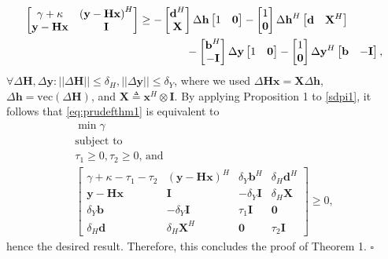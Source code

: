 \documentclass[review,sort&compress]{elsarticle}
\renewcommand{\vec}[1]{\mbox{$\mathbf{#1}$}}
\newcommand{\norm}[1]{\left|\left|#1\right|\right|}
\newcommand{\defi}{\triangleq}
\newcommand{\nn}{\nonumber}
\newcommand{\vH}{\vec{H}}
\newcommand{\vx}{\vec{x}}
\newcommand{\vy}{\vec{y}}
\newcommand{\dH}{\Delta\vH}
\newcommand{\dy}{\Delta\vy}
\newcommand{\vd}{\vec{d}}
\newcommand{\dvh}{\Delta\vec{h}}
\newcommand{\vX}{\vec{X}}
\newcommand{\vI}{\vec{I}}
\newcommand{\vb}{\vec{b}}
\begin{document}
\begin{align}\label{sdpi1}
  \begin{bmatrix}
  \gamma + \kappa   & \left( \vy - \vH \vx \right)^H  \\
  \vy - \vH \vx     & \vI
  \end{bmatrix}
  & \geq -
  \begin{bmatrix} \vd^H \\ \vX \end{bmatrix}
  \dvh
  \begin{bmatrix} 1 & \vec{0} \end{bmatrix}
  -
  \begin{bmatrix} 1 \\ \vec{0} \end{bmatrix}
  \dvh^H
  \begin{bmatrix} \vd & \vX^H \end{bmatrix} \nn\\
  & \hspace{1.5cm} -
  \begin{bmatrix} \vb^H \\ -\vI \end{bmatrix}
  \dy
  \begin{bmatrix} 1 & \vec{0} \end{bmatrix}
  -
  \begin{bmatrix} 1 \\ \vec{0} \end{bmatrix}
  \dy^H
  \begin{bmatrix} \vb & -\vI \end{bmatrix},
\end{align}
$\forall \dH, \dy : \norm{\dH} \leq \delta_H, \norm{\dy} \leq \delta_Y$, where we used $\dH \vx = \vX\dvh$, $\dvh = \mathrm{vec}\left(\dH\right)$, and $\vX \defi \vx^H \otimes \vI$. By applying Proposition 1 to \eqref{sdpi1}, it follows that \eqref{eq:prudefthm1} is equivalent to
\begin{gather}
  \min \gamma \nn\\
  \mbox{subject to} \nn\\
  \tau_1 \geq 0, \tau_2 \geq 0 \text{, and} \nn\\
  \begin{bmatrix}
  \gamma + \kappa - \tau_1 - \tau_2   & (\vy - \vH \vx)^H  & \delta_Y \vb^H  & \delta_H \vd^H  \\
  \vy - \vH \vx                       & \vI                & -\delta_Y \vI   & \delta_H \vX  \\
  \delta_Y \vb                        & -\delta_Y \vI      & \tau_1 \vI      & \vec{0}  \\
  \delta_H \vd                        & \delta_H \vX^H     & \vec{0}         & \tau_2 \vI
  \end{bmatrix} \geq 0, \nn
\end{gather}
hence the desired result. Therefore, this concludes the proof of Theorem 1. \hfill $\square$
\end{document}
